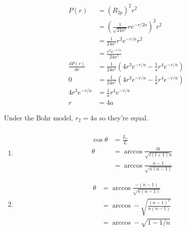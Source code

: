 \documentclass{article}
\begin{document}
\begin{align*}
  P(r)               & = (R_{2p})^2 r^2                                                                \\
                     & = \left( \frac{1}{\sqrt{24 a^5}} r e^{-r / 2 a} \right)^2 r^2                   \\
                     & = \frac{1}{24 a^5} r^2 e^{-r / a} r^2                                           \\
                     & = \frac{r^4 e^{-r / a}}{24 a^5}                                                 \\
  \frac{d P(r)}{d r} & = \frac{1}{24 a^5} \left( 4 r^3 e^{-r / a} - \frac{1}{a} r^4 e^{-r / a} \right) \\
  0                  & = \frac{1}{24 a^5} \left( 4 r^3 e^{-r / a} - \frac{1}{a} r^4 e^{-r / a} \right) \\
  4 r^3 e^{-r / a}   & = \frac{1}{a} r^4 e^{-r / a}                                                    \\
  r                  & = 4 a
\end{align*}

Under the Bohr model, $r_2 = 4 a$ so they're equal.

\setcounter{subsubsection}{52}
\subsubsection{}

\begin{enumerate}
  \item

        \begin{align*}
          \cos \theta & = \frac{L_z}{L}                                  \\
          \theta      & = \arccos \frac{l \hbar}{\sqrt{l (l + 1)} \hbar} \\
                      & = \arccos \frac{n - 1}{\sqrt{n (n - 1)}}
        \end{align*}

  \item

        \begin{align*}
          \theta & = \arccos \frac{-(n - 1)}{\sqrt{n (n - 1)}}   \\
                 & = \arccos -\sqrt{\frac{(n - 1)^2}{n (n - 1)}} \\
                 & = \arccos -\sqrt{1 - 1 / n}
        \end{align*}
\end{enumerate}
\end{document}

